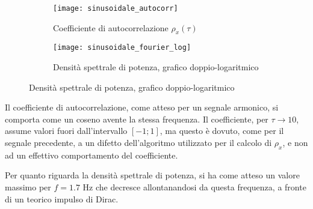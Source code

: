 \documentclass{article} %
\begin{document}
\begin{figure}[h!]
	\begin{subfigure}{0.5\textwidth}
		\texttt{[image: sinusoidale\_autocorr]}
		\caption{Coefficiente di autocorrelazione $\rho_x(\tau)$}
	\end{subfigure}
	\begin{subfigure}{0.5\textwidth}
		\texttt{[image: sinusoidale\_fourier\_log]}
		\caption{Densità spettrale di potenza, grafico doppio-logaritmico}
	\end{subfigure}
\end{figure}\par
Il coefficiente di autocorrelazione, come atteso per un segnale armonico, si comporta come un coseno avente la stessa frequenza. Il coefficiente, per  $\tau \to 10$, assume valori fuori dall'intervallo $[-1; 1]$, ma questo è dovuto, come per il segnale precedente, a un difetto dell'algoritmo utilizzato per il calcolo di $\rho_x$, e non ad un effettivo comportamento del coefficiente.\par
Per quanto riguarda la densità spettrale di potenza, si ha come atteso un valore massimo per $f = 1.7$ Hz che decresce allontanandosi  da questa frequenza, a fronte di un teorico impulso di Dirac.
\newpage
\end{document}
